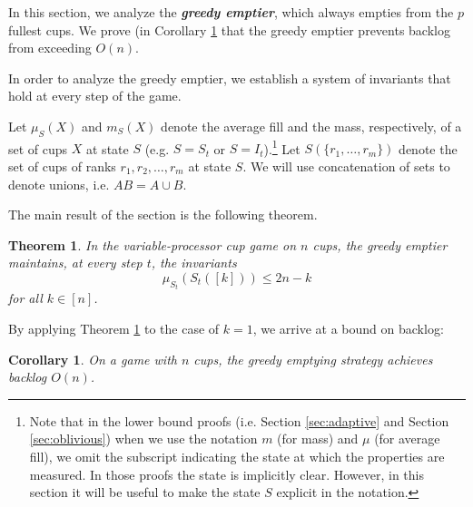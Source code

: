 \documentclass[twocolumn]{article}[10pt]
\newcommand{\defn}[1]{{\textit{\textbf{\boldmath #1}}}\xspace}
\newtheorem{corollary}{Corollary}
\newtheorem{theorem}{Theorem}
\begin{document}
In this section, we analyze the \defn{greedy emptier}, which always empties
from the $p$ fullest cups. We prove (in Corollary \ref{cor:upperbound} that the
greedy emptier prevents backlog from exceeding $O(n)$. 

In order to analyze the greedy emptier, we establish a system of invariants
that hold at every step of the game. 

Let $\mu_S(X)$ and $m_S(X)$ denote the average fill and the mass, respectively,
of a set of cups $X$ at state $S$ (e.g. $S=S_t$ or $S=I_t$).\footnote{Note that
  in the lower bound proofs (i.e. Section \ref{sec:adaptive} and Section
  \ref{sec:oblivious}) when we use the notation $m$ (for mass) and $\mu$ (for
average fill), we omit the subscript indicating the state at which the
properties are measured. In those proofs the state is implicitly clear.
However, in this section it will be useful to make the state $S$ explicit in
the notation.} Let $S(\{r_1, \ldots, r_m\})$ denote the set of cups of ranks
$r_1, r_2, \ldots, r_m$ at state $S$. We will use concatenation of sets to
denote unions, i.e. $AB = A\cup B$. 

The main result of the section is the following theorem.  
\begin{theorem}
  \label{thm:invariant}
  In the variable-processor cup game on $n$ cups, the greedy emptier maintains, at every step $t$,
  the invariants
  \begin{equation}
    \label{eq:invariants}
      \mu_{S_t}(S_t([k])) \le 2n-k
  \end{equation}
  for all  $k \in [n]$.
\end{theorem}

By applying Theorem \ref{thm:invariant} to the case of $k = 1$, we arrive at a bound on backlog:
\begin{corollary}
  On a game with $n$ cups, the greedy emptying strategy achieves backlog $O(n)$.
  \label{cor:upperbound}
\end{corollary}
\end{document}
